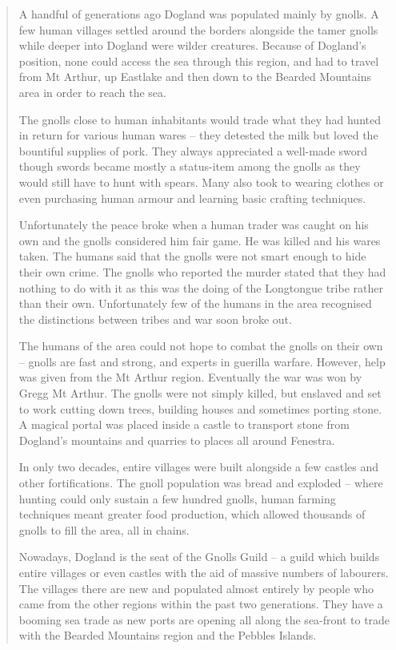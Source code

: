 \begin{multicols}{2}
\begin{quotation}
	A handful of generations ago Dogland was populated mainly by gnolls.
	A few human villages settled around the borders alongside the tamer gnolls while deeper into Dogland were wilder creatures.
	Because of Dogland's position, none could access the sea through this region, and had to travel from Mt Arthur, up Eastlake and then down to the Bearded Mountains area in order to reach the sea.

	The gnolls close to human inhabitants would trade what they had hunted in return for various human wares -- they detested the milk but loved the bountiful supplies of pork.
	They always appreciated a well-made sword though swords became mostly a status-item among the gnolls as they would still have to hunt with spears.
	Many also took to wearing clothes or even purchasing human armour and learning basic crafting techniques.

	Unfortunately the peace broke when a human trader was caught on his own and the gnolls considered him fair game.
	He was killed and his wares taken.
	The humans said that the gnolls were not smart enough to hide their own crime.
	The gnolls who reported the murder stated that they had nothing to do with it as this was the doing of the Longtongue tribe rather than their own.
	Unfortunately few of the humans in the area recognised the distinctions between tribes and war soon broke out.

	The humans of the area could not hope to combat the gnolls on their own -- gnolls are fast and strong, and experts in guerilla warfare.
	However, help was given from the Mt Arthur region.
	Eventually the war was won by Gregg Mt Arthur.
	The gnolls were not simply killed, but enslaved and set to work cutting down trees, building houses and sometimes porting stone.
	A magical portal was placed inside a castle to transport stone from Dogland's mountains and quarries to places all around Fenestra.

	In only two decades, entire villages were built alongside a few castles and other fortifications.
	The gnoll population was bread and exploded -- where hunting could only sustain a few hundred gnolls, human farming techniques meant greater food production, which allowed thousands of gnolls to fill the area, all in chains.

	Nowadays, Dogland is the seat of the Gnolls Guild -- a guild which builds entire villages or even castles with the aid of massive numbers of labourers.
	The villages there are new and populated almost entirely by people who came from the other regions within the past two generations.
	They have a booming sea trade as new ports are opening all along the sea-front to trade with the Bearded Mountains region and the Pebbles Islands.

\end{quotation}

\end{multicols}

